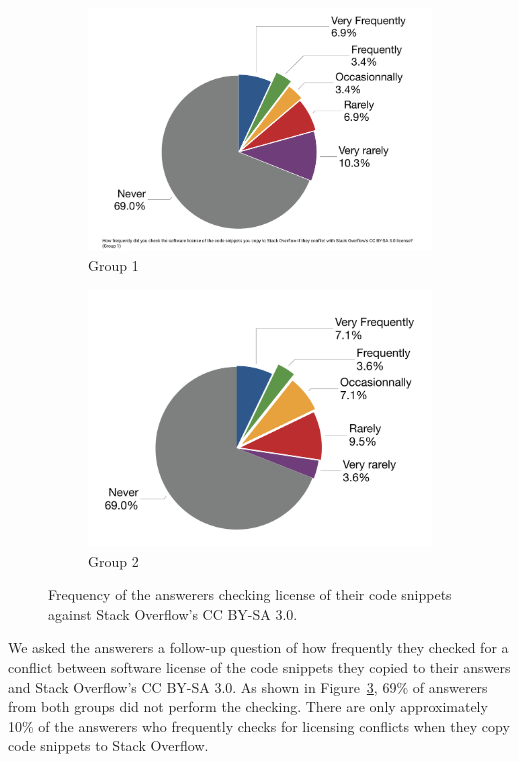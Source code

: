 \documentclass{svjour3}                     %
\begin{document}
\begin{figure}
	\begin{subfigure}{.5\textwidth}
		\centering
		\includegraphics[width=.75\linewidth]{survey_license_check_1}
		\caption{Group 1}
		\label{fig:survey_license_check_1}
	\end{subfigure}%
	\begin{subfigure}{.5\textwidth}
		\centering
		\includegraphics[width=.75\linewidth]{survey_license_check_2}
		\caption{Group 2}
		\label{fig:survey_license_check_2}
	\end{subfigure}
	\caption{Frequency of the answerers checking license of their code snippets against Stack Overflow's CC BY-SA 3.0.}
	\label{fig:survey_license_check}
\end{figure}

We asked the answerers a follow-up question of how frequently they checked for a
conflict between software license of the code snippets they copied to their
answers and Stack Overflow's CC BY-SA 3.0. As shown in
Figure~\ref{fig:survey_license_check}, 69\% of answerers from both groups did
not perform the checking. There are only approximately 10\% of the answerers who
frequently checks for licensing conflicts when they copy code snippets to Stack
Overflow.
\end{document}
